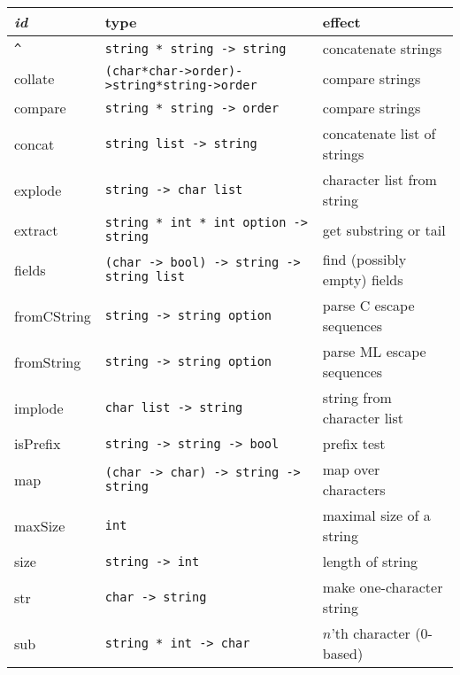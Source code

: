 \documentclass[fleqn,a4paper]{article}
\begin{document}
\noindent\begin{tabular}{@{\tt\ \ }lll}\hline
{\it id\/}  &  type &     effect \\\hline

\verb#^# & {\tt string * string -> string} & concatenate strings\\

collate & {\tt (char*char->order)->string*string->order} & compare strings\\

compare & {\tt string * string -> order} & compare strings\\

concat    & {\tt string list -> string} & concatenate list of strings
\\

explode   & {\tt string -> char list} & character list from string\\

extract & {\tt string * int * int option -> string} & get substring or tail\\

fields    & {\tt (char -> bool) -> string -> string list} & find
(possibly empty) fields\\

fromCString & {\tt string -> string option} & parse C escape
sequences\\ 

fromString & {\tt string -> string option} & parse ML escape sequences\\

implode   & {\tt char list -> string} & string from character list\\

isPrefix  & {\tt string -> string -> bool} & prefix test\\

map       & {\tt (char -> char) -> string -> string} & map over characters\\

maxSize   & \verb#int# & maximal size of a string\\

size      & {\tt string -> int}
          & length of string\\

str       & {\tt char -> string} & make one-character string\\

sub       & {\tt string * int -> char}
          & $n$'th character (0-based)\\


\end{tabular}
\end{document}
